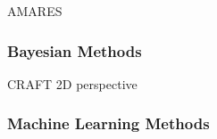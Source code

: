 \ac{AMARES}\cite{Vanhamme1997}


\subsubsection{Bayesian Methods}
\ac{CRAFT}\cite{Krishnamurthy2013}
2D\cite{Krishnamurthy2017}
perspective\cite{Krishnamurthy2021}

\subsubsection{Machine Learning Methods}
\cite{Schmid2023}
